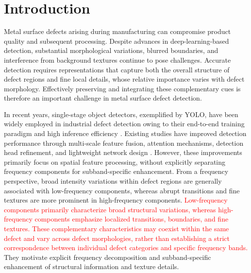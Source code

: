 \documentclass[pdflatex,sn-nature]{sn-jnl}
\newcommand{\rev}[1]{\textcolor{red}{#1}}
\begin{document}

\maketitle

\section{Introduction}\label{sec:introduction}

    Metal surface defects arising during manufacturing can compromise product quality and subsequent processing. Despite advances in deep-learning-based detection, substantial morphological variations, blurred boundaries, and interference from background textures continue to pose challenges. Accurate detection requires representations that capture both the overall structure of defect regions and fine local details, whose relative importance varies with defect morphology. Effectively preserving and integrating these complementary cues is therefore an important challenge in metal surface defect detection.
    
    In recent years, single-stage object detectors, exemplified by YOLO, have been widely employed in industrial defect detection owing to their end-to-end training paradigm and high inference efficiency \cite{Redmon2016YOLO,Jocher2024YOLO11}. Existing studies have improved detection performance through multi-scale feature fusion, attention mechanisms, detection head refinement, and lightweight network design \cite{Yu2022ESNet,Liu2025GCNet,Liu2026GSSAYOLO,Zheng2026ACMSPYOLO,Zhang2026DRFMFF,Zhang2024MSFCRA}. However, these improvements primarily focus on spatial feature processing, without explicitly separating frequency components for subband-specific enhancement. From a frequency perspective, broad intensity variations within defect regions are generally associated with low-frequency components, whereas abrupt transitions and fine textures are more prominent in high-frequency components. \rev{Low-frequency components primarily characterize broad structural variations, whereas high-frequency components emphasize localized transitions, boundaries, and fine textures. These complementary characteristics may coexist within the same defect and vary across defect morphologies, rather than establishing a strict correspondence between individual defect categories and specific frequency bands.} They motivate explicit frequency decomposition and subband-specific enhancement of structural information and texture details.
\end{document}
